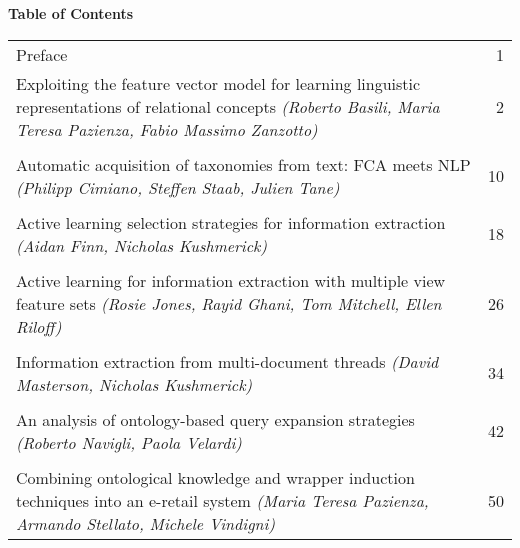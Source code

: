 \documentclass[12pt,a4paper]{article}
\begin{document}
\begin{center}

\mbox{}
\vspace{2cm}

\begin{large}
\textbf{Table of Contents}
\end{large}

\mbox{}
\bigskip
\mbox{}
\bigskip
\mbox{}

\begin{tabular}{p{}r}

Preface
& 1 \\

Exploiting the feature vector model for learning linguistic representations of relational concepts
\emph{(Roberto Basili, Maria Teresa Pazienza, Fabio Massimo Zanzotto)}
& 2 \\

\mbox{} \\[-8pt]

Automatic acquisition of taxonomies from text: FCA meets NLP
\emph{(Philipp Cimiano, Steffen Staab, Julien Tane)}
& 10 \\

\mbox{} \\[-8pt]

Active learning selection strategies for information extraction
\emph{(Aidan Finn, Nicholas Kushmerick)}
& 18 \\

\mbox{} \\[-8pt]

Active learning for information extraction with multiple view feature sets
\emph{(Rosie Jones, Rayid Ghani, Tom Mitchell, Ellen Riloff)}
& 26 \\

\mbox{} \\[-8pt]

Information extraction from multi-document threads
\emph{(David Masterson, Nicholas Kushmerick)}
& 34 \\

\mbox{} \\[-8pt]

An analysis of ontology-based query expansion strategies
\emph{(Roberto Navigli, Paola Velardi)}
& 42 \\

\mbox{} \\[-8pt]

Combining ontological knowledge and wrapper induction techniques into an e-retail system
\emph{(Maria Teresa Pazienza, Armando Stellato, Michele Vindigni)}
& 50 \\


\end{tabular}
\end{center}
\end{document}
